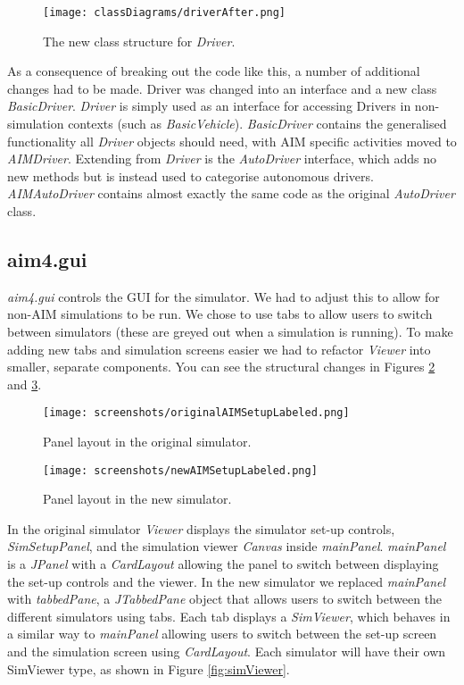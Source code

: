 \begin{appendices}
\begin{figure}[htb]
\texttt{[image: classDiagrams/driverAfter.png]}
\caption{The new class structure for \emph{Driver}.}
\label{fig:driverAfter}
\end{figure}

As a consequence of breaking out the code like this, a number of additional changes had to be made. Driver was changed into an interface and a new class \emph{BasicDriver}. \emph{Driver} is simply used as an interface for accessing Drivers in non-simulation contexts (such as \emph{BasicVehicle}). \emph{BasicDriver} contains the generalised functionality all \emph{Driver} objects should need, with AIM specific activities moved to \emph{AIMDriver}. Extending from \emph{Driver} is the \emph{AutoDriver} interface, which adds no new methods but is instead used to categorise autonomous drivers. \emph{AIMAutoDriver} contains almost exactly the same code as the original \emph{AutoDriver} class.

\subsection{aim4.gui}
\label{subsec:aim4.gui}
\emph{aim4.gui} controls the GUI for the simulator. We had to adjust this to allow for non-AIM simulations to be run. We chose to use tabs to allow users to switch between simulators (these are greyed out when a simulation is running). To make adding new tabs and simulation screens easier we had to refactor \emph{Viewer} into smaller, separate components. You can see the structural changes in Figures \ref{fig:originalAIMSetupLabeled} and \ref{fig:newAIMSetupLabeled}.

\begin{figure}[htb]
\texttt{[image: screenshots/originalAIMSetupLabeled.png]}
\caption{Panel layout in the original simulator.}
\label{fig:originalAIMSetupLabeled}
\end{figure}

\begin{figure}[htb]
\texttt{[image: screenshots/newAIMSetupLabeled.png]}
\caption{Panel layout in the new simulator.}
\label{fig:newAIMSetupLabeled}
\end{figure}

In the original simulator \emph{Viewer} displays the simulator set-up controls, \emph{SimSetupPanel}, and the simulation viewer \emph{Canvas} inside \emph{mainPanel}. \emph{mainPanel} is a \emph{JPanel} with a \emph{CardLayout} allowing the panel to switch between displaying the set-up controls and the viewer. In the new simulator we replaced \emph{mainPanel} with \emph{tabbedPane}, a \emph{JTabbedPane} object that allows users to switch between the different simulators using tabs. Each tab displays a \emph{SimViewer}, which behaves in a similar way to \emph{mainPanel} allowing users to switch between the set-up screen and the simulation screen using \emph{CardLayout}. Each simulator will have their own SimViewer type, as shown in Figure \ref{fig:simViewer}.


\end{appendices}
